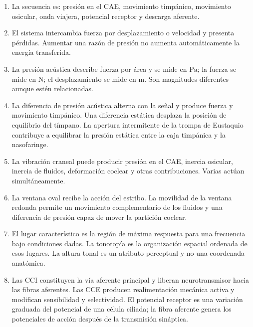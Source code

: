 \begin{enumerate}[label=\textbf{C\arabic*.},leftmargin=*]
    \item La secuencia es: presión en el CAE, movimiento timpánico, movimiento
    osicular, onda viajera, potencial receptor y descarga aferente.

    \item El sistema intercambia fuerza por desplazamiento o velocidad y
    presenta pérdidas. Aumentar una razón de presión no aumenta
    automáticamente la energía transferida.

    \item La presión acústica describe fuerza por área y se mide en
    \(\text{Pa}\); la fuerza se mide en \(\text{N}\); el desplazamiento se
    mide en \(\text{m}\). Son magnitudes diferentes aunque estén relacionadas.

    \item La diferencia de presión acústica alterna con la señal y produce
    fuerza y movimiento timpánico. Una diferencia estática desplaza la
    posición de equilibrio del tímpano. La apertura intermitente de la trompa
    de Eustaquio contribuye a equilibrar la presión estática entre la caja
    timpánica y la nasofaringe.

    \item La vibración craneal puede producir presión en el CAE, inercia
    osicular, inercia de fluidos, deformación coclear y otras contribuciones.
    Varias actúan simultáneamente.

    \item La ventana oval recibe la acción del estribo. La movilidad de la
    ventana redonda permite un movimiento complementario de los fluidos y una
    diferencia de presión capaz de mover la partición coclear.

    \item El lugar característico es la región de máxima respuesta para una
    frecuencia bajo condiciones dadas. La tonotopía es la organización
    espacial ordenada de esos lugares. La altura tonal es un atributo
    perceptual y no una coordenada anatómica.

    \item Las CCI constituyen la vía aferente principal y liberan
    neurotransmisor hacia las fibras aferentes. Las CCE producen
    realimentación mecánica activa y modifican sensibilidad y selectividad. El
    potencial receptor es una variación graduada del potencial de una célula
    ciliada; la fibra aferente genera los potenciales de acción después de la
    transmisión sináptica.
\end{enumerate}

